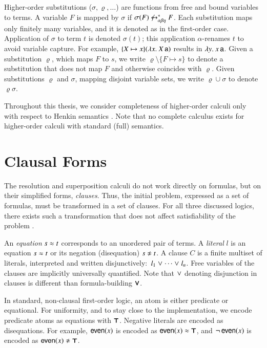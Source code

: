 Higher-order substitutions ($\sigma,\varrho,\ldots$) are functions from free and bound
variables to terms. A variable $F$ is mapped by $\sigma$ if $ \sigma(F) \not\equi
F$. Each substitution maps only finitely many variables, and it is denoted as in
the first-order case. Application of  $\sigma$ to term $t$ is denoted $\sigma(t)$;
this application $\alpha$-renames $t$ to avoid variable capture. For example,
$\{X \mapsto x\}(\lambda x.\> X \, \mathsf{a})$ results in $\lambda y.\> x \, \mathsf{a}$.  Given a substitution
$\varrho$, which maps $F$ to $s$, we write $\varrho\setminus\{F \mapsto s\}$ to
denote a substitution that does not map $F$ and otherwise coincides with
$\varrho$. Given substitutions $\varrho$ and $\sigma$, mapping disjoint variable
sets, we write $\varrho \cup \sigma$ to denote $\varrho\sigma$.

Throughout this thesis, we consider completeness of higher-order calculi only
with respect to Henkin semantics \cite{bm-14-automation-ho}. Note that no
complete calculus exists for higher-order calculi with standard (full)
semantics.

\section{Clausal Forms}
\label{sec:pre:clauses}

The resolution and superposition calculi do not work directly on formulas, but
on their simplified forms, {\em clauses}. Thus, the initial problem, expressed as a
set of formulas, must be transformed in a set of clauses. For all three
discussed logics, there exists such a transformation that does not affect
satisfiability of the problem \cite{nw-01-small-cnf}.

An {\em equation} $s \approx t$ corresponds to an unordered pair of terms. A {\em literal} $l$ is an equation $s \approx t$ or its negation (disequation) $s \noteq t$. A clause $C$ is a
finite multiset of literals, interpreted and written disjunctively:\ $l_1 \mathrel\lor
\cdots \mathrel\lor l_n$. Free variables of the clauses are implicitly
universally quantified. Note that $\mathrel\lor$ denoting disjunction in clauses
is different than formula-building $\pmb\lor$.

In standard, non-clausal first-order logic, an atom is either
predicate or equational. For uniformity, and to
stay close to the implementation, we encode predicate atoms as equations with
$\pmb\top$. Negative literals are encoded as disequations. For example,
$\mathsf{even}(x)$ is encoded as $\mathsf{even}(x) \approx \pmb\top$, and
$\neg\,\mathsf{even}(x)$ is encoded as $\neglit{\cst{even}(x)}$. 

